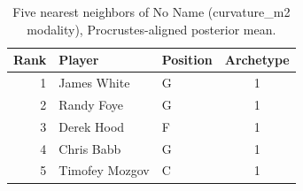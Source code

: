 \begin{table}[htbp]
  \centering\small
  \begin{tabular}{rllc}
    \toprule
    Rank & Player & Position & Archetype \\
    \midrule
    1 & James White & G & 1 \\
    2 & Randy Foye & G & 1 \\
    3 & Derek Hood & F & 1 \\
    4 & Chris Babb & G & 1 \\
    5 & Timofey Mozgov & C & 1 \\
    \bottomrule
  \end{tabular}
  \caption{Five nearest neighbors of No Name (curvature_m2 modality), Procrustes-aligned posterior mean.}
  \label{tab:No_Name_neighbors_curvature_m2}
\end{table}

